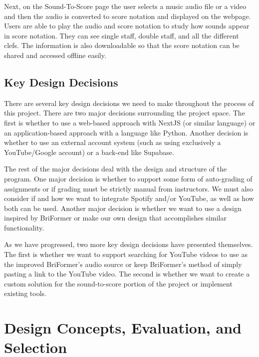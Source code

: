\documentclass[12pt, letterpaper]{article}
\begin{document}
Next, on the Sound-To-Score page the user selects a music audio file or a video and then the audio is converted to score notation and displayed on the webpage. Users are able to play the audio and score notation to study how sounds appear in score notation. They can see single staff, double staff, and all the different clefs. The information is also downloadable so that the score notation can be shared and accessed offline easily.

\subsection*{Key Design Decisions}
There are several key design decisions we need to make throughout the process of this project. There are two major decisions surrounding the project space. The first is whether to use a web-based approach with NextJS (or similar language) or an application-based approach with a language like Python. Another decision is whether to use an external account system (such as using exclusively a YouTube/Google account) or a back-end like Supabase.

The rest of the major decisions deal with the design and structure of the program. One major decision is whether to support some form of auto-grading of assignments or if grading must be strictly manual from instructors. We must also consider if and how we want to integrate Spotify and/or YouTube, as well as how both can be used. Another major decision is whether we want to use a design inspired by BriFormer or make our own design that accomplishes similar functionality.

As we have progressed, two more key design decisions have presented themselves. The first is whether we want to support searching for YouTube videos to use as the improved BriFormer’s audio source or keep BriFormer’s method of simply pasting a link to the YouTube video. The second is whether we want to create a custom solution for the sound-to-score portion of the project or implement existing tools.

\section*{Design Concepts, Evaluation, and Selection}
\end{document}
